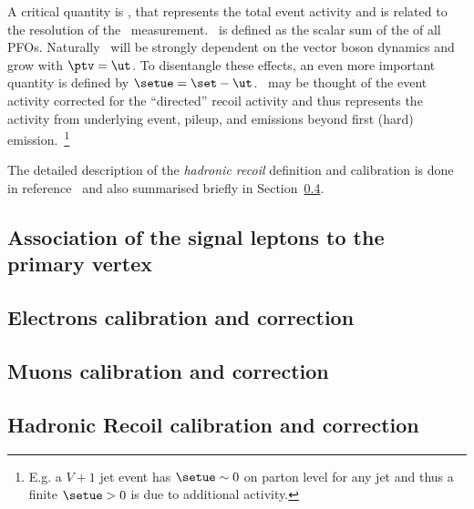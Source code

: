 A critical quantity is \set, that represents the total event
activity and is related to the resolution of the \ut\
measurement. \set\ is defined as the scalar sum of the \pt of all
PFOs. Naturally \set\ will be strongly dependent on the vector boson
dynamics and grow with $\ptv=\ut$. To disentangle these effects, an
even more important quantity is defined by $\setue = \set -
\ut$. \setue\ may be thought of the event activity corrected for the
``directed'' recoil activity and thus represents the activity from
underlying event, pileup, and emissions beyond first (hard)
emission.~\footnote{E.g. a $V+1$ jet event has $\setue \sim 0$ on
  parton level for any jet \pt and thus a finite $\setue > 0$ is due to additional
  activity.}


The detailed description of the \textit{hadronic recoil} definition and calibration is done in reference~\cite{Li:2657182} and also summarised briefly in Section~\ref{sec:recoilCorr}.

\subsection{Association of the signal leptons to the primary vertex}\label{sec:pvcorr}


\subsection{Electrons calibration and correction}\label{sec:elCorr}


\subsection{Muons calibration and correction}\label{sec:muCorr}


\subsection{Hadronic Recoil calibration and correction}\label{sec:recoilCorr}

